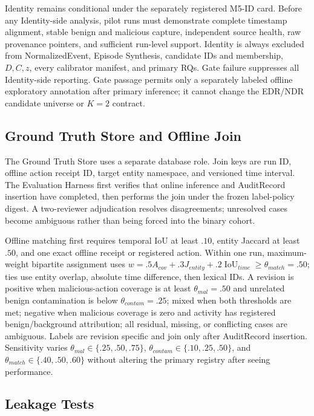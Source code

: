 Identity remains conditional under the separately registered M5-ID card. Before any
Identity-side analysis, pilot runs must demonstrate complete
timestamp alignment, stable benign and malicious capture, independent source health, raw
provenance pointers, and sufficient run-level support. Identity is always excluded from
NormalizedEvent, Episode Synthesis, candidate IDs and membership, $D,C,z$, every calibrator
manifest, and primary RQs. Gate failure suppresses all Identity-side reporting. Gate passage
permits only a separately labeled offline exploratory annotation after primary inference; it
cannot change the EDR/NDR candidate universe or $K=2$ contract.

\subsection{Ground Truth Store and Offline Join}

The Ground Truth Store uses a separate database role. Join keys are run ID, offline action receipt
ID, target entity namespace, and versioned time interval. The Evaluation Harness first verifies
that online inference and AuditRecord insertion have completed, then performs the join under
the frozen label-policy digest. A two-reviewer adjudication resolves disagreements; unresolved
cases become ambiguous rather than being forced into the binary cohort.

Offline matching first requires temporal IoU at least $.10$, entity Jaccard at least $.50$,
and one exact offline receipt or registered action. Within one run, maximum-weight bipartite
assignment uses
$w=.5A_{cov}+.3J_{entity}+.2\operatorname{IoU}_{time}\ge\theta_{match}=.50$;
ties use entity overlap, absolute time difference, then lexical IDs. A revision is positive
when malicious-action coverage is at least $\theta_{mal}=.50$ and unrelated benign
contamination is below $\theta_{contam}=.25$; mixed when both thresholds are met; negative when
malicious coverage is zero and activity has registered benign/background attribution; all
residual, missing, or conflicting cases are ambiguous. Labels are revision specific and join
only after AuditRecord insertion. Sensitivity varies $\theta_{mal}\in\{.25,.50,.75\}$,
$\theta_{contam}\in\{.10,.25,.50\}$, and $\theta_{match}\in\{.40,.50,.60\}$ without altering
the primary registry after seeing performance.

\subsection{Leakage Tests}

